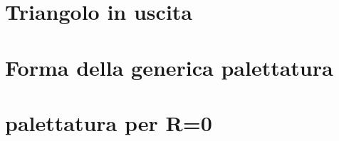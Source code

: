 \documentclass[a4paper, 15pt]{article}
\begin{document}
\section{Triangolo in uscita}

\section{Forma della generica palettatura }
 
\section{palettatura per R=0}
%
\end{document}
